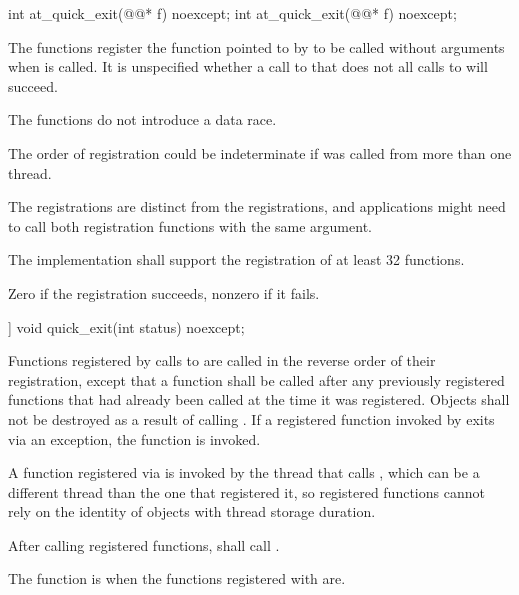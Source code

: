 %
\begin{itemdecl}
int at_quick_exit(@@* f) noexcept;
int at_quick_exit(@@* f) noexcept;
\end{itemdecl}

\begin{itemdescr}
\pnum
\effects
The  functions register the function pointed to by 
to be called without arguments when  is called.
It is unspecified whether a call to  that does not
all calls to  will succeed.
\begin{note}
The
 functions do not introduce a
data race.
\end{note}
\begin{note}
The order of registration could be indeterminate if  was called from more
than one thread.
\end{note}
\begin{note}
The
 registrations are distinct from the  registrations,
and applications might need to call both registration functions with the same argument.
\end{note}

\pnum
\implimits
The implementation shall support the registration of at least 32 functions.

\pnum
\returns
Zero if the registration succeeds, nonzero if it fails.
\end{itemdescr}

%
\begin{itemdecl}
[[noreturn]] void quick_exit(int status) noexcept;
\end{itemdecl}

\begin{itemdescr}
\pnum
\effects
Functions registered by calls to  are called in the
reverse order of their registration, except that a function shall be called after any
previously registered functions that had already been called at the time it was
registered. Objects shall not be destroyed as a result of calling .
If a registered function invoked by  exits via an exception,
the function  is invoked.%
\begin{note}
A function registered via 
is invoked by the thread that calls ,
which can be a different thread
than the one that registered it, so registered functions cannot rely on the identity
of objects with thread storage duration.
\end{note}
After calling registered functions,  shall call .

\pnum
\remarks
{}%
The function  is 
when the functions registered with  are.
\end{itemdescr}


